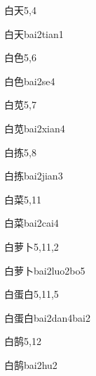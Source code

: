 \begin{entry}{白天}{5,4}
  \begin{phonetics}{白天}{bai2tian1}
  \end{phonetics}
\end{entry}

\begin{entry}{白色}{5,6}
  \begin{phonetics}{白色}{bai2se4}
  \end{phonetics}
\end{entry}

\begin{entry}{白苋}{5,7}
  \begin{phonetics}{白苋}{bai2xian4}
  \end{phonetics}
\end{entry}

\begin{entry}{白拣}{5,8}
  \begin{phonetics}{白拣}{bai2jian3}
  \end{phonetics}
\end{entry}

\begin{entry}{白菜}{5,11}
  \begin{phonetics}{白菜}{bai2cai4}
  \end{phonetics}
\end{entry}

\begin{entry}{白萝卜}{5,11,2}
  \begin{phonetics}{白萝卜}{bai2luo2bo5}
  \end{phonetics}
\end{entry}

\begin{entry}{白蛋白}{5,11,5}
  \begin{phonetics}{白蛋白}{bai2dan4bai2}
  \end{phonetics}
\end{entry}

\begin{entry}{白鹄}{5,12}
  \begin{phonetics}{白鹄}{bai2hu2}
  \end{phonetics}
\end{entry}

